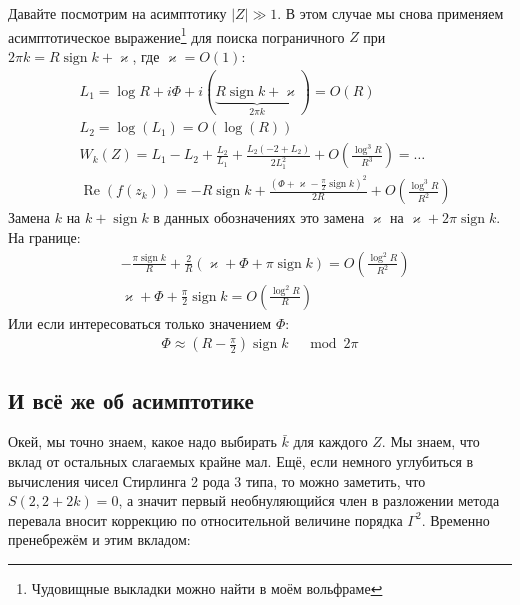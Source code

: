 \documentclass[a4paper, 12pt]{article}
\DeclareMathOperator*{\sign}{sign}
\DeclareMathOperator*{\Real}{Re}
\begin{document}
Давайте посмотрим на асимптотику $|Z|\gg 1$. В этом случае мы снова применяем асимптотическое выражение\footnote{Чудовищные выкладки можно найти в моём вольфраме} для поиска пограничного $Z$ при $2\pi k= R\sign k + \varkappa$, где $\varkappa = O(1)$:
\begin{equation}
\begin{aligned}
    &L_1 = \log R + i \Phi + i\left(\underbrace{R\sign k + \varkappa}_{2\pi k}\right) = O(R)\\
    &L_2 = \log(L_1) = O(\log(R))\\
    &W_k(Z) = L_1 - L_2 + \frac{L_2}{L_1} + \frac{L_2(-2+L_2)}{2L_1^2} + O\left(\frac{\log^3 R}{R^3}\right) = \dots\\
    &\Real(f(z_k)) =  -R\sign k + \frac{\left(\Phi + \varkappa - \frac{\pi}{2}\sign k\right)^2}{2R} +
     O\left(\frac{\log^3 R}{R^2}\right)
\end{aligned}
\end{equation}
Замена $k$ на $k+\sign k$ в данных обозначениях это замена $\varkappa$ на $\varkappa + 2\pi\sign k$. На границе:
\begin{equation}
\begin{aligned}
    &-\frac{\pi\sign k}{R} + \frac{2}{R}
    \left(\varkappa + \Phi + \pi\sign k\right) = O\left(\frac{\log^2 R}{R^2}\right)\\
    &\varkappa + \Phi + \frac{\pi}{2}\sign k= O\left(\frac{\log^2 R}{R}\right)
\end{aligned}
\end{equation}
Или если интересоваться только значением $\Phi$:
\begin{equation}
\begin{aligned}
    \Phi \approx \left(R-\frac{\pi}{2}\right)\sign k \;\;\; \mod 2\pi
\end{aligned}
\end{equation}

\subsection*{И всё же об асимптотике}

Окей, мы точно знаем, какое надо выбирать $\bar k$ для каждого $Z$. Мы знаем, что вклад от остальных слагаемых крайне мал. Ещё, если немного углубиться в вычисления чисел Стирлинга 2 рода 3 типа, то можно заметить, что $S(2, 2+2k)=0$, а значит первый необнуляющийся член в разложении метода перевала вносит коррекцию по относительной величине порядка $\Gamma^2$. Временно пренебрежём и этим вкладом:
\end{document}
